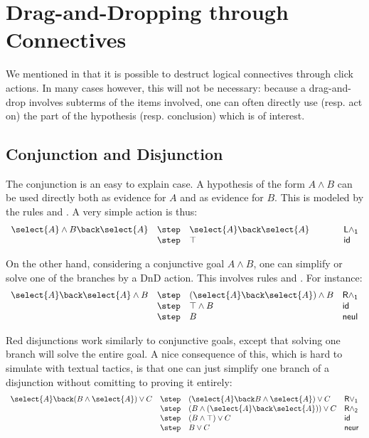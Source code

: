 \section{Drag-and-Dropping through Connectives}
We mentioned in  that it is possible to destruct logical
connectives through click actions. In many cases however, this will not be
necessary: because a drag-and-drop involves subterms of the items involved, one
can often directly use (resp. act on) the part of the hypothesis (resp.
conclusion) which is of interest.

\subsection{Conjunction and Disjunction}
The conjunction is an easy to explain case. A hypothesis of the form
$A\land B$ can be used directly both as evidence for $A$ and as evidence
for $B$. This is modeled by the rules  and
. A very simple action is thus:
$$
\begin{array}{llll}
  \select{A}\land B \back \select{A} & \step& \select{A} \back
  \select{A} \hbox to 1cm {\hfil}&\mathsf{L \land_1}\\
                                       & \step &\top & \mathsf{id}
\end{array}
$$

On the other hand, considering a conjunctive goal $A\land B$, one can
simplify or solve one of the branches by a DnD action. This involves
rules  and
. For instance:
$$
\begin{array}{llll}
  \select{A} \back \select{A}\land B &
                                         \step& (\select{A} \back
                                         \select{A})\land B &\mathsf{R \land_1}\\
                                       & \step& \top \land B  & \mathsf{id}\\
  &\step& B&\mathsf{neul}
\end{array}
$$

Red disjunctions work similarly to conjunctive goals, except that solving one
branch will solve the entire goal. A nice consequence of this, which is hard to
simulate with textual tactics, is that one can just simplify one branch of a
disjunction without comitting to proving it entirely:
$$
\begin{array}{llll}
  \select{A} \back (B \land \select{A}) \lor C
    & \step & (\select{A} \back B \land \select{A}) \lor C &\mathsf{R\lor_1}\\
    & \step & (B \land (\select{A} \back \select{A})) \lor C &\mathsf{R\land_2}\\
    & \step & (B \land \top) \lor C &\mathsf{id}\\
    & \step & B \lor C &\mathsf{neur}
\end{array}
$$

